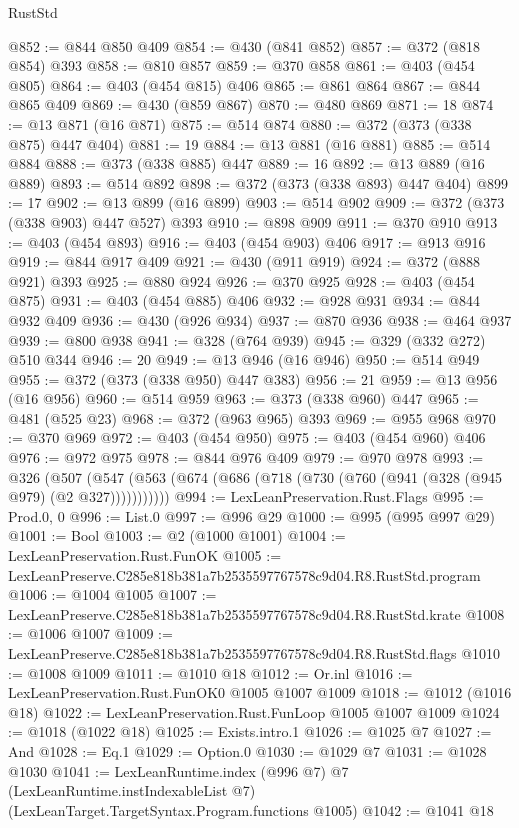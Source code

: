 \begin{lexlean}{RustStd}
\begin{coremodule}
@852 := @844 @850 @409
@854 := @430 (@841 @852)
@857 := @372 (@818 @854) @393
@858 := @810 @857
@859 := @370 @858
@861 := @403 (@454 @805)
@864 := @403 (@454 @815) @406
@865 := @861 @864
@867 := @844 @865 @409
@869 := @430 (@859 @867)
@870 := @480 @869
@871 := 18
@874 := @13 @871 (@16 @871)
@875 := @514 @874
@880 := @372 (@373 (@338 @875) @447 @404)
@881 := 19
@884 := @13 @881 (@16 @881)
@885 := @514 @884
@888 := @373 (@338 @885) @447
@889 := 16
@892 := @13 @889 (@16 @889)
@893 := @514 @892
@898 := @372 (@373 (@338 @893) @447 @404)
@899 := 17
@902 := @13 @899 (@16 @899)
@903 := @514 @902
@909 := @372 (@373 (@338 @903) @447 @527) @393
@910 := @898 @909
@911 := @370 @910
@913 := @403 (@454 @893)
@916 := @403 (@454 @903) @406
@917 := @913 @916
@919 := @844 @917 @409
@921 := @430 (@911 @919)
@924 := @372 (@888 @921) @393
@925 := @880 @924
@926 := @370 @925
@928 := @403 (@454 @875)
@931 := @403 (@454 @885) @406
@932 := @928 @931
@934 := @844 @932 @409
@936 := @430 (@926 @934)
@937 := @870 @936
@938 := @464 @937
@939 := @800 @938
@941 := @328 (@764 @939)
@945 := @329 (@332 @272) @510 @344
@946 := 20
@949 := @13 @946 (@16 @946)
@950 := @514 @949
@955 := @372 (@373 (@338 @950) @447 @383)
@956 := 21
@959 := @13 @956 (@16 @956)
@960 := @514 @959
@963 := @373 (@338 @960) @447
@965 := @481 (@525 @23)
@968 := @372 (@963 @965) @393
@969 := @955 @968
@970 := @370 @969
@972 := @403 (@454 @950)
@975 := @403 (@454 @960) @406
@976 := @972 @975
@978 := @844 @976 @409
@979 := @970 @978
@993 := @326
    (@507 (@547 (@563 (@674 (@686 (@718 (@730 (@760 (@941 (@328 (@945 @979) (@2 @327)))))))))))
@994 := LexLeanPreservation.Rust.Flags
@995 := Prod.{0, 0}
@996 := List.{0}
@997 := @996 @29
@1000 := @995 (@995 @997 @29)
@1001 := Bool
@1003 := @2 (@1000 @1001)
@1004 := LexLeanPreservation.Rust.FunOK
@1005 := LexLeanPreserve.C285e818b381a7b2535597767578c9d04.R8.RustStd.program
@1006 := @1004 @1005
@1007 := LexLeanPreserve.C285e818b381a7b2535597767578c9d04.R8.RustStd.krate
@1008 := @1006 @1007
@1009 := LexLeanPreserve.C285e818b381a7b2535597767578c9d04.R8.RustStd.flags
@1010 := @1008 @1009
@1011 := @1010 @18
@1012 := Or.inl
@1016 := LexLeanPreservation.Rust.FunOK0 @1005 @1007 @1009
@1018 := @1012 (@1016 @18)
@1022 := LexLeanPreservation.Rust.FunLoop @1005 @1007 @1009
@1024 := @1018 (@1022 @18)
@1025 := Exists.intro.{1}
@1026 := @1025 @7
@1027 := And
@1028 := Eq.{1}
@1029 := Option.{0}
@1030 := @1029 @7
@1031 := @1028 @1030
@1041 := LexLeanRuntime.index
    (@996 @7)
    @7
    (LexLeanRuntime.instIndexableList @7)
    (LexLeanTarget.TargetSyntax.Program.functions @1005)
@1042 := @1041 @18

\end{coremodule}
\end{lexlean}
